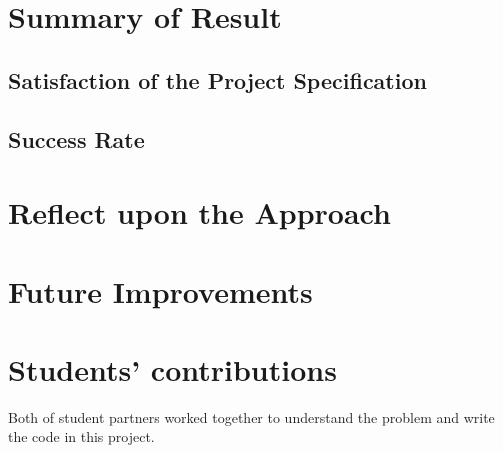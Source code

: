 \documentclass[12pt,twoside,letterpaper]{article}
\begin{document}
\section{Summary of Result}
\subsection{Satisfaction of the Project Specification}
\subsection{Success Rate}
\clearpage

\section{Reflect upon the Approach}
\lipsum
\clearpage

\section{Future Improvements}
\lipsum
\vfill
\section*{Students' contributions}
Both of student partners worked together to understand the problem and write the code in this project.
\end{document}
